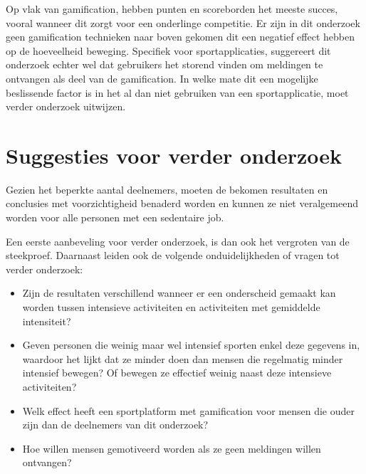 Op vlak van gamification, hebben punten en scoreborden het meeste succes, vooral wanneer dit zorgt voor een onderlinge competitie. Er zijn in dit onderzoek geen gamification technieken naar boven gekomen dit een negatief effect hebben op de hoeveelheid beweging. Specifiek voor sportapplicaties, suggereert dit onderzoek echter wel dat gebruikers het storend vinden om meldingen te ontvangen als deel van de gamification. In welke mate dit een mogelijke beslissende factor is in het al dan niet gebruiken van een sportapplicatie, moet verder onderzoek uitwijzen.

\section{Suggesties voor verder onderzoek}

Gezien het beperkte aantal deelnemers, moeten de bekomen resultaten en conclusies met voorzichtigheid benaderd worden en kunnen ze niet veralgemeend worden voor alle personen met een sedentaire job.

Een eerste aanbeveling voor verder onderzoek, is dan ook het vergroten van de steekproef. Daarnaast leiden ook de volgende onduidelijkheden of vragen tot verder onderzoek:

\begin{itemize}
    \item Zijn de resultaten verschillend wanneer er een onderscheid gemaakt kan worden tussen intensieve activiteiten en activiteiten met gemiddelde intensiteit?
    \item Geven personen die weinig maar wel intensief sporten enkel deze gegevens in, waardoor het lijkt dat ze minder doen dan mensen die regelmatig minder intensief bewegen? Of bewegen ze effectief weinig naast deze intensieve activiteiten?
    \item Welk effect heeft een sportplatform met gamification voor mensen die ouder zijn dan de deelnemers van dit onderzoek?
    \item Hoe willen mensen gemotiveerd worden als ze geen meldingen willen ontvangen?
\end{itemize}